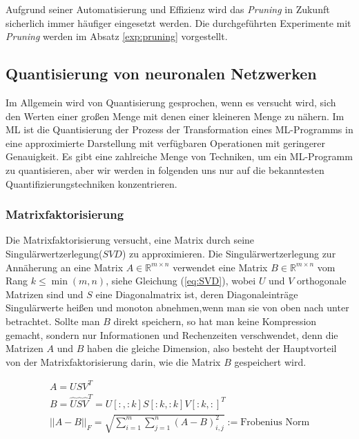 \documentclass[12pt,a4paper]{scrartcl}
\numberwithin{equation}{section}
\newcommand{\R}{\mathbb{R}} %
\begin{document}
Aufgrund seiner Automatisierung und Effizienz wird das \textit{Pruning} in Zukunft sicherlich immer häufiger eingesetzt werden. Die durchgeführten Experimente mit \textit{Pruning} werden im Absatz \ref{exp:pruning} vorgestellt.


\subsection{ Quantisierung von neuronalen Netzwerken}\label{kom:quantization}
Im Allgemein wird von Quantisierung gesprochen, wenn es versucht wird, sich den Werten einer großen Menge mit denen einer kleineren Menge zu nähern. Im \ac{ML} ist die Quantisierung der Prozess der Transformation eines ML-Programms in eine approximierte Darstellung mit verfügbaren Operationen mit geringerer Genauigkeit.
Es gibt eine zahlreiche Menge von Techniken, um ein ML-Programm zu quantisieren, aber wir werden in folgenden uns nur auf die bekanntesten Quantifizierungstechniken konzentrieren.
\subsubsection{Matrixfaktorisierung}
Die Matrixfaktorisierung versucht, eine Matrix durch seine Singulärwertzerlegung($ SVD $) zu approximieren.
Die Singulärwertzerlegung zur Annäherung an eine Matrix $ A \in \R^{m\times n} $ verwendet eine Matrix $ B \in \R^{m\times n}  $ vom Rang $ k \le \min(m, n) $, siehe Gleichung (\ref{eq:SVD}), wobei $ U $ und $ V $ orthogonale Matrizen sind und $ S $ eine Diagonalmatrix ist, deren Diagonaleinträge Singulärwerte heißen und monoton abnehmen,wenn man sie von oben nach unter betrachtet. Sollte man $ B $ direkt speichern, so hat man keine Kompression gemacht, sondern nur Informationen und Rechenzeiten verschwendet, denn die Matrizen $ A $ und $ B $ haben die gleiche Dimension, also besteht der Hauptvorteil von der Matrixfaktorisierung darin, wie die Matrix $ B $ gespeichert wird.

\begin{equation}\label{eq:SVD}
	\begin{array}{l}
	A = USV^T\\
	B = \widehat{U}\widehat{S}\widehat{V}^T =  U[:,:k] S[:k,:k] V[:k, :]^T \\
	{||A - B||_F} = \sqrt{\sum_{i = 1}^{m} \sum_{j =1}^{n} (A-B)_{i,j}^2} := \text{Frobenius Norm}
	\end{array}	
\end{equation}
\end{document}

